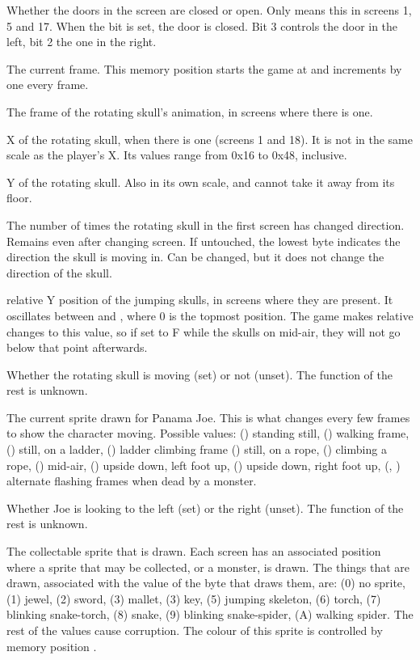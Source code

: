 {\begin{enumerate}
 Whether the doors in the screen are closed or
open. Only means this in screens 1, 5 and 17. When the bit is set, the door is
closed. Bit 3 controls the door in the left, bit 2 the one in the right.

 The current frame. This memory position starts the game at
 and increments by one every frame.

 The frame of the rotating skull's animation, in
screens where there is one.

 X of the rotating skull, when there is one (screens
1 and 18). It is not in the same scale as the player's X. Its values range from
0x16 to 0x48, inclusive.

 Y of the rotating skull. Also in its own scale, and
cannot take it away from its floor.

 The number of times the rotating skull in the
first screen has changed direction. Remains even after changing screen. If
untouched, the lowest byte indicates the direction the skull is moving in. Can
be changed, but it does not change the direction of the skull.

 relative Y position of the jumping skulls, in screens where they are present.
It oscillates between  and , where 0 is the topmost position. The
game makes relative changes to this value, so if set to F while the skulls on
mid-air, they will not go below that point afterwards.

 Whether the rotating skull is moving (set) or
not (unset). The function of the rest is unknown.

 The current sprite drawn for Panama Joe. This is what
changes every few frames to show the character moving. Possible values: ()
standing still, () walking frame, () still, on a ladder, ()
ladder climbing frame () still, on a rope, () climbing a rope,
() mid-air, () upside down, left foot up, () upside down,
right foot up, (, ) alternate flashing frames when dead by a monster.

 Whether Joe is looking to the left (set) or the
right (unset). The function of the rest is unknown.

 The collectable sprite that is drawn. Each screen has
an associated position where a sprite that may be collected, or a monster, is
drawn. The things that are drawn, associated with the value of the byte that
draws them, are: (0) no sprite, (1) jewel, (2) sword, (3) mallet, (3) key, (5) jumping
skeleton, (6) torch, (7) blinking snake-torch, (8) snake, (9) blinking
snake-spider, (A) walking spider. The rest of the values cause corruption. The
colour of this sprite is controlled by memory position
\hyperref[ram:collectable-colour]{}.


\end{enumerate}}

